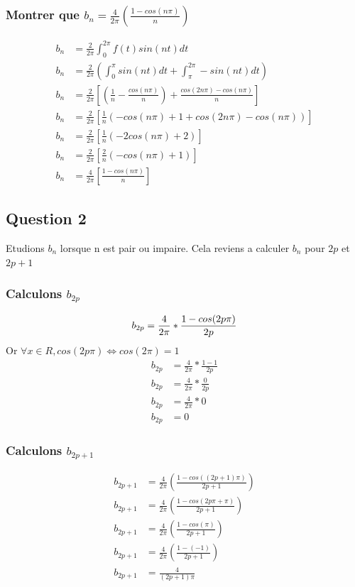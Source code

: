 \documentclass[a4paper,10pt]{report}
\begin{document}
\subsubsection{Montrer que $b_n = \frac{4}{2\pi}(\frac{1-cos(n\pi)}{n})$}
\begin{align*}
b_n &= \frac{2}{2\pi} \int_{0}^{2\pi} f(t) sin(nt) dt\\
b_n &= \frac{2}{2\pi} (\int_{0}^{\pi} sin(nt) dt + \int_{\pi}^{2\pi} -sin(nt) dt)\\
b_n &= \frac{2}{2\pi} [(\frac{1}{n} - \frac{cos(n\pi)}{n}) + \frac{cos(2n\pi) - cos(n\pi)}{n}]\\
b_n &= \frac{2}{2\pi} [\frac{1}{n} (-cos(n\pi) + 1 + cos(2n\pi) - cos(n\pi))]\\
b_n &= \frac{2}{2\pi} [\frac{1}{n} (-2cos(n\pi) + 2)]\\
b_n &= \frac{2}{2\pi} [\frac{2}{n} (-cos(n\pi) + 1)]\\
b_n &= \frac{4}{2\pi} [\frac{1 - cos(n\pi)}{n}]
\end{align*}

\subsection{Question 2}
Etudions $b_n$ lorsque n est pair ou impaire.
Cela reviens a calculer $b_n$ pour $2p$ et $2p+1$

\subsubsection{Calculons $b_{2p}$}
\begin{equation*}
b_{2p} = \frac{4}{2\pi}*\frac{1-cos(2p\pi)}{2p}\\
\end{equation*}
Or $\forall x  	\in R, cos(2p\pi) \Leftrightarrow  cos(2\pi) = 1$
\begin{align*}
b_{2p} &= \frac{4}{2\pi}*\frac{1-1}{2p}\\
b_{2p} &= \frac{4}{2\pi}*\frac{0}{2p}\\
b_{2p} &= \frac{4}{2\pi}*0\\
b_{2p} &= 0
\end{align*}

\subsubsection{Calculons $b_{2p+1}$}
\begin{align*}
b_{2p+1} &= \frac{4}{2\pi}(\frac{1-cos((2p+1)\pi)}{2p+1})\\
b_{2p+1} &= \frac{4}{2\pi}(\frac{1-cos(2p\pi+\pi)}{2p+1})\\
b_{2p+1} &= \frac{4}{2\pi}(\frac{1-cos(\pi)}{2p+1})\\
b_{2p+1} &= \frac{4}{2\pi}(\frac{1-(-1)}{2p+1})\\
b_{2p+1} &= \frac{4}{(2p+1)\pi}\\
\end{align*}
\end{document}
